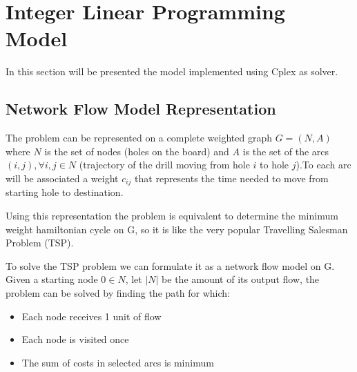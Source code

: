 \section{Integer Linear Programming Model}
	In this section will be presented the model implemented using Cplex as solver.
	\subsection{Network Flow Model Representation}
		The problem can be represented on a complete weighted graph $G=(N, A)$ where $N$ is the set of nodes (holes on the board) and $A$ is the set of the arcs $(i, j), ∀ i, j ∈ N$ (trajectory of the drill moving from hole $i$ to hole $j$).To each arc will be associated a weight $c_{ij}$ that represents the time needed to move from starting hole to destination.
		
		Using this representation the problem is equivalent to determine the minimum weight hamiltonian cycle on G, so it is like the very popular Travelling Salesman Problem (TSP).
		
		To solve the TSP problem we can formulate it as a network flow model on G. Given a starting node $0 ∈ N$, let $|N|$ be the amount of its output flow, the problem can be solved by finding the path for which:
		\begin{itemize}
			\item Each node receives 1 unit of flow
			\item Each node is visited once
			\item The sum of costs in selected arcs is minimum
		\end{itemize}
		
